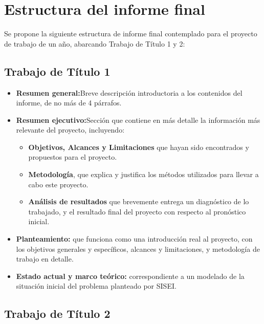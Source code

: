 \section{Estructura del informe final}
Se propone la siguiente estructura de informe final contemplado para el proyecto de trabajo de un año, abarcando Trabajo de Título 1 y 2:

  \subsection{Trabajo de Título 1}
  \begin{itemize}
    \item \textbf{Resumen general:}Breve descripción introductoria a los contenidos del informe, de no más de 4 párrafos.
    \item \textbf{Resumen ejecutivo:}Sección que contiene en más detalle la información más relevante del proyecto, incluyendo:
      \begin{itemize}
        \item \textbf{Objetivos, Alcances y Limitaciones} que hayan sido encontrados y propuestos para el proyecto.
        \item \textbf{Metodología}, que explica y justifica los métodos utilizados para llevar a cabo este proyecto.
        \item \textbf{Análisis de resultados} que brevemente entrega un diagnóstico de lo trabajado, y el resultado final del proyecto con respecto al pronóstico inicial.
      \end{itemize}
    \item \textbf{Planteamiento:} que funciona como una introducción real al proyecto, con los objetivos generales y específicos, alcances y limitaciones, y metodología de trabajo en detalle.
    \item \textbf{Estado actual y marco teórico:} correspondiente a un modelado de la situación inicial del problema planteado por SISEI.
  \end{itemize}

  \subsection{Trabajo de Título 2}

\clearpage
